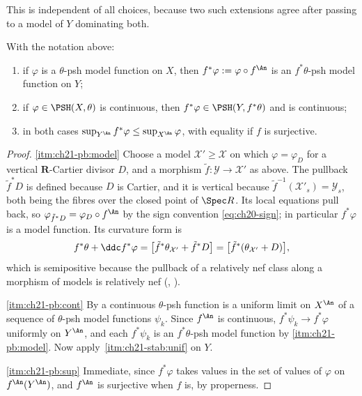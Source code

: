 This is independent of all choices, because two such extensions agree after
passing to a model of \(Y\) dominating both.

\begin{proposition}
\label{prop:ch21-pullback}
With the notation above:
\begin{enumerate}
\item\label{itm:ch21-pb:model}
if \(\varphi\) is a \(\theta\)-psh model function on \(X\), then
\(f^*\varphi:=\varphi\circ f^{\An}\) is an \(f^*\theta\)-psh model function
on \(Y\);
\item\label{itm:ch21-pb:cont}
if \(\varphi\in\PSH(X,\theta)\) is continuous, then
\(f^*\varphi\in\PSH(Y,f^*\theta)\) and is continuous;
\item\label{itm:ch21-pb:sup}
in both cases \(\sup_{Y^{\An}}f^*\varphi\leq\sup_{X^{\An}}\varphi\), with
equality if \(f\) is surjective.
\end{enumerate}
\end{proposition}

\begin{proof}
\cref{itm:ch21-pb:model}  Choose a model \(\mathcal X'\geq\mathcal X\) on
which \(\varphi=\varphi_D\) for a vertical \(\mathbf R\)-Cartier divisor
\(D\), and a morphism \(\tilde f:\mathcal Y\to\mathcal X'\) as above.  The
pullback \(\tilde f^*D\) is defined because \(D\) is Cartier, and it is
vertical because \(\tilde f^{-1}(\mathcal X'_s)=\mathcal Y_s\), both being
the fibres over the closed point of \(\Spec R\).  Its local equations pull
back, so \(\varphi_{\tilde f^*D}=\varphi_D\circ f^{\An}\) by the sign
convention \eqref{eq:ch20-sign}; in particular \(f^*\varphi\) is a model
function.  Its curvature form is
\[
 f^*\theta+\ddc f^*\varphi
 =\bigl[\tilde f^*\theta_{\mathcal X'}+\tilde f^*D\bigr]
 =\bigl[\tilde f^*(\theta_{\mathcal X'}+D)\bigr],
\]
which is semipositive because the pullback of a relatively nef class along a
morphism of models is relatively nef
(, ).

\cref{itm:ch21-pb:cont}  By  a continuous
\(\theta\)-psh function is a uniform limit on \(X^{\An}\) of a sequence of
\(\theta\)-psh model functions \(\psi_k\).  Since \(f^{\An}\) is continuous,
\(f^*\psi_k\to f^*\varphi\) uniformly on \(Y^{\An}\), and each
\(f^*\psi_k\) is an \(f^*\theta\)-psh model function by
\cref{itm:ch21-pb:model}.  Now apply
\,\cref{itm:ch21-stab:unif} on \(Y\).

\cref{itm:ch21-pb:sup}  Immediate, since \(f^*\varphi\) takes values in the
set of values of \(\varphi\) on \(f^{\An}(Y^{\An})\), and \(f^{\An}\) is
surjective when \(f\) is, by properness.
\end{proof}

